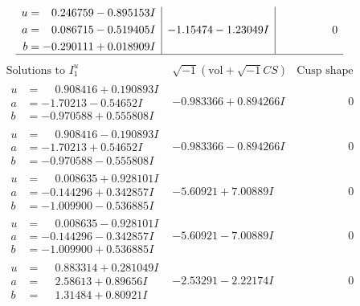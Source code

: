 \documentclass[1p]{elsarticle_modified}
\theoremstyle{definition}
\newcommand{\I}{\sqrt{-1}}
\begin{document}
$$\begin{array}{c|c|c}
\begin{aligned}
u &= \phantom{-}0.246759 - 0.895153 I \\
a &= \phantom{-}0.086715 - 0.519405 I \\
b &= -0.290111 + 0.018909 I\end{aligned}
 & -1.15474 - 1.23049 I & \phantom{-0.000000 } 0\\
 \hline 
 \end{array}$$\newpage$$\begin{array}{c|c|c}  
\text{Solutions to }I^u_{1}& \I (\text{vol} + \sqrt{-1}CS) & \text{Cusp shape}\\
 \hline 
\begin{aligned}
u &= \phantom{-}0.908416 + 0.190893 I \\
a &= -1.70213 - 0.54652 I \\
b &= -0.970588 + 0.555808 I\end{aligned}
 & -0.983366 + 0.894266 I & \phantom{-0.000000 } 0 \\ \hline\begin{aligned}
u &= \phantom{-}0.908416 - 0.190893 I \\
a &= -1.70213 + 0.54652 I \\
b &= -0.970588 - 0.555808 I\end{aligned}
 & -0.983366 - 0.894266 I & \phantom{-0.000000 } 0 \\ \hline\begin{aligned}
u &= \phantom{-}0.008635 + 0.928101 I \\
a &= -0.144296 + 0.342857 I \\
b &= -1.009900 - 0.536885 I\end{aligned}
 & -5.60921 + 7.00889 I & \phantom{-0.000000 } 0 \\ \hline\begin{aligned}
u &= \phantom{-}0.008635 - 0.928101 I \\
a &= -0.144296 - 0.342857 I \\
b &= -1.009900 + 0.536885 I\end{aligned}
 & -5.60921 - 7.00889 I & \phantom{-0.000000 } 0 \\ \hline\begin{aligned}
u &= \phantom{-}0.883314 + 0.281049 I \\
a &= \phantom{-}2.58613 + 0.89656 I \\
b &= \phantom{-}1.31484 + 0.80921 I\end{aligned}
 & -2.53291 - 2.22174 I & \phantom{-0.000000 } 0 \\ \hline\begin{aligned}

\end{aligned}
\end{array}$$
\end{document}
